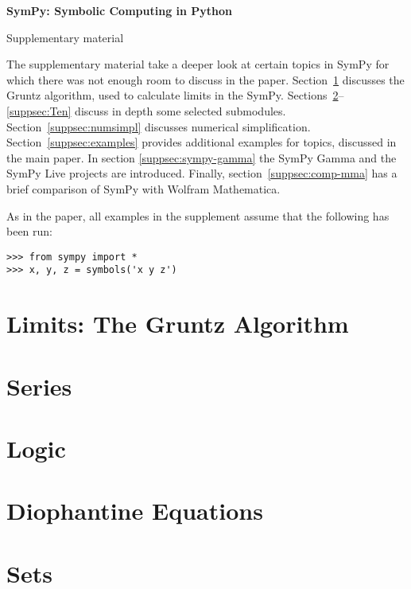 \documentclass[fleqn,10pt,lineno,numbers]{wlpeerj} %
\begin{document}
\flushbottom
\thispagestyle{empty}%
\vskip-36pt%
{\raggedright\sffamily\bfseries\fontsize{20}{25}\selectfont SymPy: Symbolic Computing in Python\par}%
\vskip10pt
{\raggedright\sffamily\fontsize{12}{16}\selectfont  Supplementary material\par}
\vskip25pt%

The supplementary material take a deeper look at certain topics in SymPy for
which there was not enough room to discuss in the paper.
Section~\ref{suppsec:Gruntz} discusses the Gruntz algorithm, used to
calculate limits in the SymPy.  Sections~\ref{suppsec:Series}--\ref{suppsec:Ten}
discuss in depth some selected submodules.  Section~\ref{suppsec:numsimpl}
discusses numerical simplification.  Section~\ref{suppsec:examples} provides
additional examples for topics, discussed in the main paper.  In section
\ref{suppsec:sympy-gamma} the SymPy Gamma
and the SymPy Live projects are introduced.  Finally, section~\ref{suppsec:comp-mma}
has a
brief comparison of SymPy with Wolfram Mathematica.

As in the paper, all examples in the supplement assume that the following
has been run:
\begin{verbatim}
>>> from sympy import *
>>> x, y, z = symbols('x y z')
\end{verbatim}


\section{Limits: The Gruntz Algorithm}
\label{suppsec:Gruntz}


\section{Series}
\label{suppsec:Series}


\section{Logic}
\label{suppsec:Logic}


\section{Diophantine Equations}
\label{suppsec:Dioph}


\section{Sets}
\label{suppsec:Sets}

\end{document}
